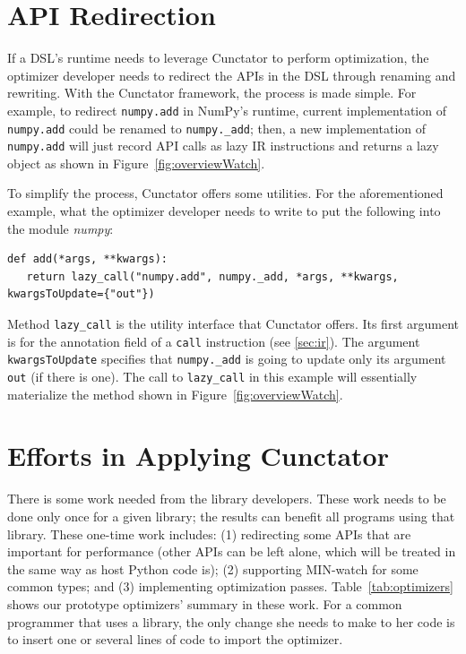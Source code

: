 \documentclass[sigconf]{acmart}\settopmatter{printfolios=true,printccs=false,printacmref=false}\setcopyright{none}
\newcommand {\REV}[1]{#1}
\begin{document}
\label{sec:dataframe}


\section{API Redirection}
\label{sec:apiredirect}

If a DSL's runtime needs to leverage Cunctator to perform optimization, the optimizer developer needs to redirect the APIs in the DSL through renaming and rewriting. With the Cunctator framework, the process is made simple. For example, to redirect \texttt{numpy.add} in NumPy's runtime, current implementation of \texttt{numpy.add} could be renamed to \texttt{numpy.\_add}; then, a new implementation of \texttt{numpy.add} will just record API calls as lazy IR instructions and returns a lazy object as shown in Figure~\ref{fig:overviewWatch}. 

To simplify the process, Cunctator offers some utilities. For the aforementioned example, what the optimizer developer needs to write to put the following into the module \textit{numpy}: 
\begin{lstlisting}[style=myPythonStyle]
def add(*args, **kwargs):
   return lazy_call("numpy.add", numpy._add, *args, **kwargs, kwargsToUpdate={"out"})
\end{lstlisting}
Method \texttt{lazy\_call} is the utility interface that Cunctator offers. Its first argument is for the annotation field of a \texttt{call} instruction (see \cref{sec:ir}). The argument \texttt{kwargsToUpdate} specifies that \texttt{numpy.\_add} is going to update only its argument \texttt{out} (if there is one). The call to \texttt{lazy\_call} in this example will essentially materialize the method shown in Figure~\ref{fig:overviewWatch}. 

\section{Efforts in Applying Cunctator}
\REV{There is some work needed from the library developers. These work needs to be done only once for a given library; the results can benefit all programs using that library. These one-time work includes: (1) redirecting some APIs that are important for performance (other APIs can be left alone, which will be treated in the same way as host Python code is); (2) supporting MIN-watch for some common types; and (3) implementing optimization passes. Table~\ref{tab:optimizers} shows our prototype optimizers' summary in these work. For a common programmer that uses a library, the only change she needs to make to her code is to insert one or several lines of code to import the optimizer.}
\end{document}
